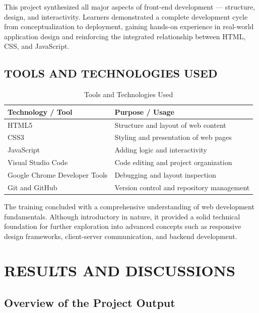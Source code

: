 \documentclass[a4paper,12pt,oneside]{report}
\numberwithin{equation}{chapter}
\numberwithin{figure}{chapter}
\numberwithin{table}{chapter}
\begin{document}
This project synthesized all major aspects of front-end development — structure, design, and interactivity. Learners demonstrated a complete development cycle from conceptualization to deployment, gaining hands-on experience in real-world application design and reinforcing the integrated relationship between HTML, CSS, and JavaScript.

\vspace{5mm}
\noindent
\section{TOOLS AND TECHNOLOGIES USED}

\begin{table}[H]
\centering
\caption{Tools and Technologies Used}
\begin{tabular}{|p{5cm}|p{8cm}|}
\hline
\textbf{Technology / Tool} & \textbf{Purpose / Usage} \\ \hline
HTML5 & Structure and layout of web content \\ \hline
CSS3 & Styling and presentation of web pages \\ \hline
JavaScript & Adding logic and interactivity \\ \hline
Visual Studio Code & Code editing and project organization \\ \hline
Google Chrome Developer Tools & Debugging and layout inspection \\ \hline
Git and GitHub & Version control and repository management \\ \hline
\end{tabular}
\end{table}

\vspace{3mm}
The training concluded with a comprehensive understanding of web development fundamentals. Although introductory in nature, it provided a solid technical foundation for further exploration into advanced concepts such as responsive design frameworks, client-server communication, and backend development.


\newpage
\chapter{RESULTS AND DISCUSSIONS}

\noindent
\section{Overview of the Project Output}
\end{document}
